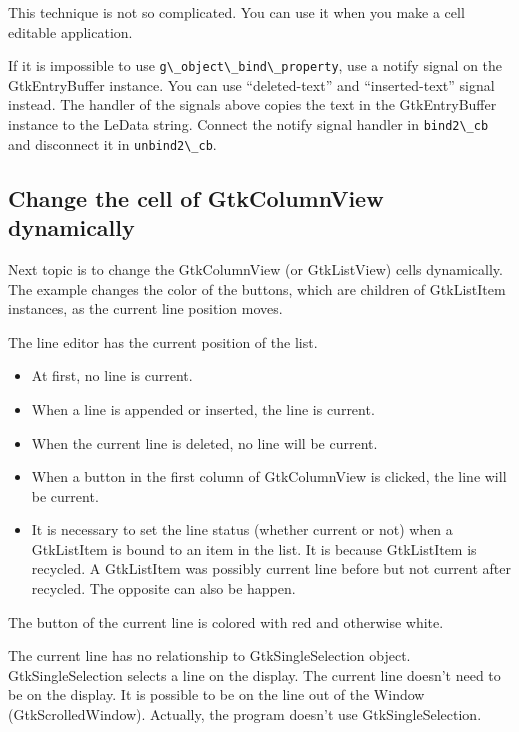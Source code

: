 This technique is not so complicated. You can use it when you make a
cell editable application.

If it is impossible to use
\passthrough{\lstinline!g\_object\_bind\_property!}, use a notify signal
on the GtkEntryBuffer instance. You can use ``deleted-text'' and
``inserted-text'' signal instead. The handler of the signals above
copies the text in the GtkEntryBuffer instance to the LeData string.
Connect the notify signal handler in \passthrough{\lstinline!bind2\_cb!}
and disconnect it in \passthrough{\lstinline!unbind2\_cb!}.

\subsection{Change the cell of GtkColumnView
dynamically}\label{change-the-cell-of-gtkcolumnview-dynamically}

Next topic is to change the GtkColumnView (or GtkListView) cells
dynamically. The example changes the color of the buttons, which are
children of GtkListItem instances, as the current line position moves.

The line editor has the current position of the list.

\begin{itemize}
\tightlist
\item
  At first, no line is current.
\item
  When a line is appended or inserted, the line is current.
\item
  When the current line is deleted, no line will be current.
\item
  When a button in the first column of GtkColumnView is clicked, the
  line will be current.
\item
  It is necessary to set the line status (whether current or not) when a
  GtkListItem is bound to an item in the list. It is because GtkListItem
  is recycled. A GtkListItem was possibly current line before but not
  current after recycled. The opposite can also be happen.
\end{itemize}

The button of the current line is colored with red and otherwise white.

The current line has no relationship to GtkSingleSelection object.
GtkSingleSelection selects a line on the display. The current line
doesn't need to be on the display. It is possible to be on the line out
of the Window (GtkScrolledWindow). Actually, the program doesn't use
GtkSingleSelection.

